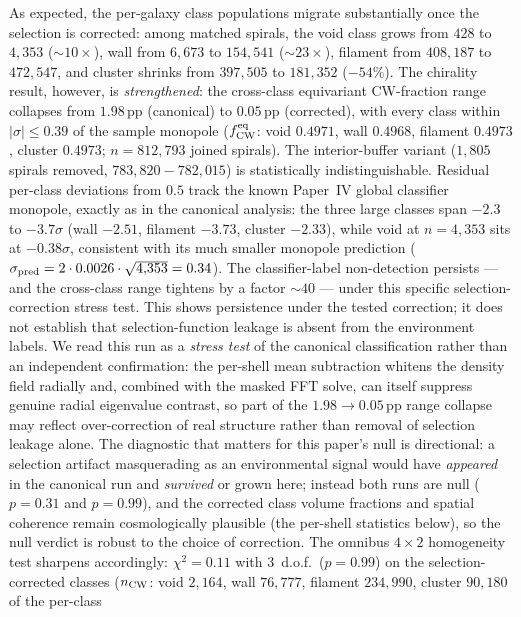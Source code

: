 \documentclass[twocolumn,linenumbers]{aastex702}
\begin{document}
As expected, the per-galaxy class populations migrate substantially
once the selection is corrected: among matched spirals, the void class
grows from $428$ to $4{,}353$ ($\sim\!10\times$), wall from $6{,}673$
to $154{,}541$ ($\sim\!23\times$), filament from $408{,}187$ to
$472{,}547$, and cluster shrinks from $397{,}505$ to $181{,}352$
($-54\%$). The chirality result, however, is \emph{strengthened}: the
cross-class equivariant CW-fraction range collapses from
$1.98$\,pp (canonical) to $0.05$\,pp (corrected), with every class
within $|\sigma| \le 0.39$ of the sample monopole
($f_{\rm CW}^{\rm eq}$: void $0.4971$, wall $0.4968$, filament
$0.4973$, cluster $0.4973$; $n = 812{,}793$ joined spirals). The
interior-buffer variant ($1{,}805$ spirals removed, $783{,}820-782{,}015$)
is statistically indistinguishable. Residual per-class deviations from $0.5$ track the
known Paper~IV global classifier monopole, exactly as in the
canonical analysis: the three large classes span $-2.3$ to
$-3.7\sigma$ (wall $-2.51$, filament $-3.73$, cluster $-2.33$), while
void at $n = 4{,}353$ sits at $-0.38\sigma$, consistent with its much
smaller monopole prediction
($\sigma_{\rm pred} = 2 \cdot 0.0026 \cdot \sqrt{4{,}353} = 0.34$). The
classifier-label non-detection persists --- and the cross-class range
tightens by a factor ${\sim}40$ --- under this specific
selection-correction stress test. This shows persistence under the tested
correction; it does not establish that selection-function leakage is absent
from the environment labels. We read this run as a \emph{stress test} of the
canonical classification rather than an independent confirmation: the
per-shell mean subtraction whitens the density field radially and,
combined with the masked FFT solve, can itself suppress genuine
radial eigenvalue contrast, so part of the $1.98 \to 0.05$\,pp range
collapse may reflect over-correction of real structure rather than
removal of selection leakage alone. The diagnostic that matters for
this paper's null is directional: a selection artifact masquerading
as an environmental signal would have \emph{appeared} in the
canonical run and \emph{survived} or grown here; instead both runs
are null ($p = 0.31$ and $p = 0.99$), and the corrected class volume
fractions and spatial coherence remain cosmologically plausible (the
per-shell statistics below), so the null verdict is robust to the choice
of correction. The omnibus $4\times2$ homogeneity test sharpens
accordingly: $\chi^2 = 0.11$ with 3~d.o.f.\ ($p = 0.99$) on the
selection-corrected classes ($n_{\rm CW}$: void $2{,}164$, wall
$76{,}777$, filament $234{,}990$, cluster $90{,}180$ of the per-class
\end{document}
